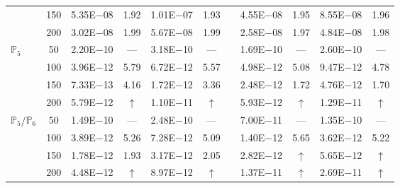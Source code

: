 \begin{table}[H]
{\begin{tabular}{@{}l c c c c c c c c c c@{}}
 & 150 & 5.35E$-$08 & 1.92  & 1.01E$-$07 & 1.93 &  & 4.55E$-$08 & 1.95 & 8.55E$-$08 & 1.96\\
 & 200 & 3.02E$-$08 & 1.99  & 5.67E$-$08 & 1.99 &  & 2.58E$-$08 & 1.97 & 4.84E$-$08 & 1.98\\
\midrule
\multirow{4}{*}{$\mathbb{P}_{5}$}
 & 50 & 2.20E$-$10 & ---  & 3.18E$-$10 & --- &  & 1.69E$-$10 & --- & 2.60E$-$10 & ---\\
 & 100 & 3.96E$-$12 & 5.79  & 6.72E$-$12 & 5.57 &  & 4.98E$-$12 & 5.08 & 9.47E$-$12 & 4.78\\
 & 150 & 7.33E$-$13 & 4.16  & 1.72E$-$12 & 3.36 &  & 2.48E$-$12 & 1.72 & 4.76E$-$12 & 1.70\\
 & 200 & 5.79E$-$12 & $\uparrow$  & 1.10E$-$11 & $\uparrow$ &  & 5.93E$-$12 & $\uparrow$ & 1.29E$-$11 & $\uparrow$\\
\midrule
\multirow{4}{*}{$\mathbb{P}_{5}/\mathbb{P}_{6}$}
 & 50 & 1.49E$-$10 & ---  & 2.48E$-$10 & --- &  & 7.00E$-$11 & --- & 1.35E$-$10 & ---\\
 & 100 & 3.89E$-$12 & 5.26  & 7.28E$-$12 & 5.09 &  & 1.40E$-$12 & 5.65 & 3.62E$-$12 & 5.22\\
 & 150 & 1.78E$-$12 & 1.93  & 3.17E$-$12 & 2.05 &  & 2.82E$-$12 & $\uparrow$ & 5.65E$-$12 & $\uparrow$\\
 & 200 & 4.48E$-$12 & $\uparrow$  & 8.97E$-$12 & $\uparrow$ &  & 1.37E$-$11 & $\uparrow$ & 2.69E$-$11 & $\uparrow$\\
\bottomrule
\end{tabular}}
\label{none}
\end{table}

